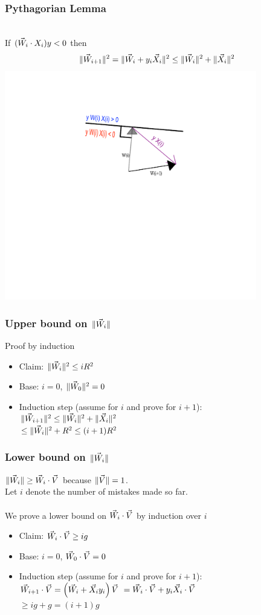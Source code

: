 \documentclass{beamer}
\begin{document}
\begin{frame}
\frametitle{Pythagorian Lemma}
~\\
If $(\vec{W}_i \cdot X_i) y <0$ then\\
\pause
\[
\| \vec{W}_{i+1} \|^2 = \|\vec{W}_i + y_i \vec{X}_i\|^2 \leq \|\vec{W}_i\|^2 + \|\vec{X}_i\|^2 
\]
\pause
\includegraphics[height=10cm]{PerceptronAnim/PerceptronError.pdf}
\end{frame}

\begin{frame}
\frametitle{Upper bound on $\| \vec{W}_i \|$}
\pause
Proof by induction
\begin{itemize}
\item Claim: $ \| \vec{W}_{i} \|^2 \leq i R^2 $
\item Base: $i=0$, $\|\vec{W}_0\|^2 = 0$
\item Induction step (assume for $i$ and prove for $i+1$):\\
$ \| \vec{W}_{i+1} \|^2 \leq \|\vec{W}_i\|^2 + \|\vec{X}_i\|^2 $ \\
$\leq \|\vec{W}_i\|^2 + R^2 \leq (i+1) R^2$

\end{itemize}
\end{frame}

\begin{frame}
\frametitle{Lower bound on $\| \vec{W}_i \|$}
\pause
$\|\vec{W}_i\| \geq \vec{W}_{i} \cdot \vec{V}$ because $\| \vec{V} \|=1$.\\
\pause
Let $i$ denote the number of mistakes made so far.\\~\\
\pause
We prove a lower bound on $\vec{W}_{i} \cdot \vec{V}$ by induction over $i$
\begin{itemize}
\item Claim: $ \vec{W}_{i} \cdot \vec{V} \geq i g $
\item Base: $i=0$, $\vec{W}_0 \cdot \vec{V} = 0$
\item Induction step (assume for $i$ and prove for $i+1$):\\
$ \vec{W}_{i+1} \cdot \vec{V}  = \left( \vec{W}_i + \vec{X}_i y_i \right) \vec{V}$
\pause
$= \vec{W}_i \cdot \vec{V} + y_i \vec{X}_i \cdot \vec{V}$ \\
$\geq i g + g = (i+1) g$
\end{itemize}
\end{frame}
\end{document}
